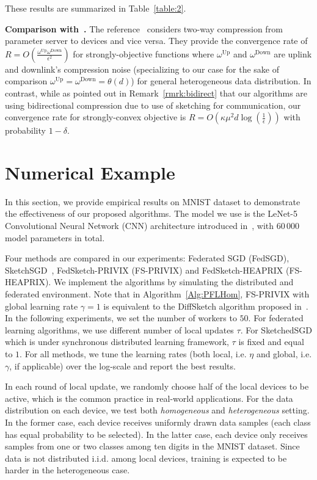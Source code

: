 \documentclass[twoside]{article}
\begin{document}
These results are summarized in Table~\ref{table:2}.



\vspace{0.1in}\noindent\textbf{Comparison with~\cite{philippenko2020artemis}.} The reference~\cite{philippenko2020artemis} considers two-way compression from parameter server to devices and vice versa. They provide the convergence rate of $R=O\left(\frac{\omega^{\text{Up}}\omega^{\text{Down}}}{\epsilon^2}\right)$ for strongly-objective functions where $\omega^{\text{Up}}$ and $\omega^{\text{Down}}$ are uplink and downlink's compression noise (specializing to our case for the sake of comparison $\omega^{\text{Up}}=\omega^{\text{Down}}=\theta\left(d\right)$) for general heterogeneous data distribution. In contrast, while as pointed out in Remark~\ref{rmrk:bidirect} that our algorithms are using bidirectional compression due to use of sketching for communication, our convergence rate for strongly-convex objective is $R=O(\kappa\mu^2d\log\left(\frac{1}{\epsilon}\right))$ with probability $1-\delta$.  


\section{Numerical Example}\label{sec:experimnt}

In this section, we provide empirical results on MNIST dataset to demonstrate the effectiveness of our proposed algorithms. The model we use is the LeNet-5 Convolutional Neural Network (CNN) architecture introduced in~\cite{lecun1998gradient}, with $60\,000$ model parameters in total.

Four methods are compared in our experiments: Federated SGD (FedSGD), SketchSGD~\cite{ivkin2019communication}, FedSketch-PRIVIX (FS-PRIVIX) and FedSketch-HEAPRIX (FS-HEAPRIX). We implement the algorithms by simulating the distributed and federated environment. 
Note that in Algorithm~\ref{Alg:PFLHom}, FS-PRIVIX with global learning rate $\gamma=1$ is equivalent to the DiffSketch algorithm proposed in~\cite{li2018federated}. 
In the following experiments, we set the number of workers to $50$. 
For federated learning algorithms, we use different number of local updates $\tau$. 
For SketchedSGD which is under synchronous distributed learning framework, $\tau$ is fixed and equal to $1$. 
For all methods, we tune the learning rates (both local, i.e. $\eta$ and global, i.e. $\gamma$, if applicable) over the log-scale and report the best results.

In each round of local update, we randomly choose half of the local devices to be active, which is the common practice in real-world applications. 
For the data distribution on each device, we test both \emph{homogeneous} and \emph{heterogeneous} setting. 
In the former case, each device receives uniformly drawn data samples (each class has equal probability to be selected). 
In the latter case, each device only receives samples from one or two classes among ten digits in the MNIST dataset. 
Since data is not distributed i.i.d. among local devices, training is expected to be harder in the heterogeneous case.
\end{document}

